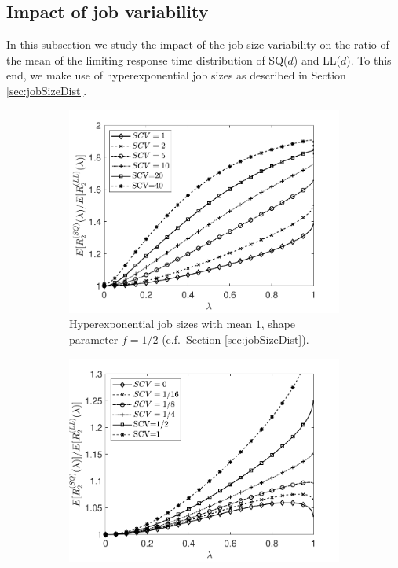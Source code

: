 \documentclass[12pt]{report}
\begin{document}
\subsection{Impact of job variability}\label{sec:SCV}
In this subsection we study the impact of the job size variability on the ratio of the
mean of the limiting response time distribution of SQ($d$) and LL($d$). To this end, we make use of hyperexponential job sizes as described in Section \ref{sec:jobSizeDist}.


\begin{figure}[t]
\begin{center}
\begin{subfigure}{0.45\textwidth}
\centering
\captionsetup{width=.8\linewidth}
\includegraphics[width=1\linewidth]{figures/Chapter2/fig3_4a.pdf}
\caption{ Hyperexponential job sizes with mean $1$, shape parameter $f=1/2$ (c.f.~Section \ref{sec:jobSizeDist}).}
\label{fig:LLDvsSQDhighSCVd2}
\end{subfigure}
\begin{subfigure}{.45\textwidth}
\centering
\captionsetup{width=.8\linewidth}
\includegraphics[width=1\linewidth]{figures/Chapter2/fig3_4b.pdf}

\end{subfigure}
\end{center}
\end{figure}
\end{document}
